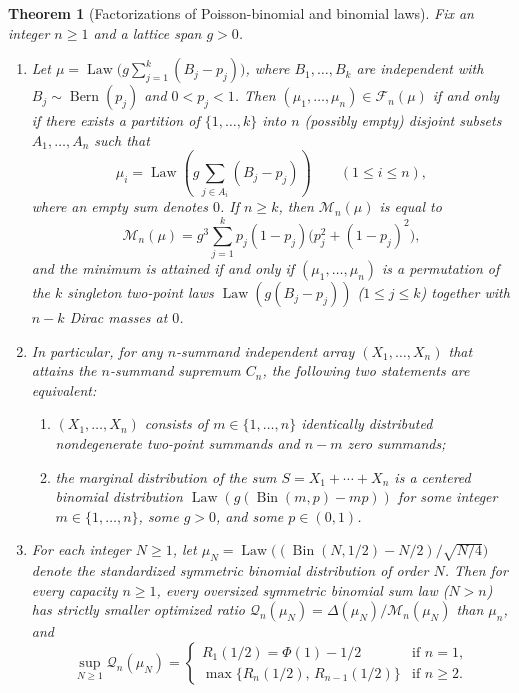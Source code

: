 \documentclass[11pt]{article}
\numberwithin{equation}{section}
\newtheorem{theorem}{Theorem}[section]
\theoremstyle{definition}
\theoremstyle{remark}
\DeclareMathOperator{\Bern}{Bern}
\DeclareMathOperator{\Bin}{Bin}
\DeclareMathOperator{\Law}{Law}
\begin{document}
\begin{theorem}[Factorizations of Poisson-binomial and binomial laws]\label{thm:binomial-fiber}
Fix an integer $n\ge1$ and a lattice span $g>0$.
\begin{enumerate}[label=(\roman*),leftmargin=2em]
\item\label{it:pb-fiber} Let $\mu=\Law\bigl(g\sum_{j=1}^k(B_j-p_j)\bigr)$,
where $B_1,\ldots,B_k$ are independent with $B_j\sim\Bern(p_j)$ and
$0<p_j<1$. Then $(\mu_1,\ldots,\mu_n)\in\mathcal F_n(\mu)$ if and only if
there exists a partition of $\{1,\ldots,k\}$ into $n$ (possibly empty)
disjoint subsets $A_1,\ldots,A_n$ such that
\begin{equation}\label{eq:pb-factor-form}
 \mu_i=\Law\left(g\sum_{j\in A_i}(B_j-p_j)\right)\qquad(1\le i\le n),
\end{equation}
where an empty sum denotes $0$. If $n\ge k$, then $\mathcal M_n(\mu)$ is
equal to
\begin{equation}\label{eq:pb-min-price}
 \mathcal M_n(\mu)=g^3\sum_{j=1}^k p_j(1-p_j)\bigl(p_j^2+(1-p_j)^2\bigr),
\end{equation}
and the minimum is attained if and only if $(\mu_1,\ldots,\mu_n)$ is a
permutation of the $k$ singleton two-point laws $\Law(g(B_j-p_j))$ ($1\le j\le k$)
together with $n-k$ Dirac masses at $0$.

\item\label{it:binomial-equivalence} In particular, for any $n$-summand
independent array $(X_1,\ldots,X_n)$ that attains the $n$-summand supremum
$C_n$, the following two statements are equivalent:
\begin{enumerate}[label=(\alph*),leftmargin=2em]
\item $(X_1,\ldots,X_n)$ consists of $m\in\{1,\ldots,n\}$ identically
distributed nondegenerate two-point summands and $n-m$ zero summands;
\item the marginal distribution of the sum $S=X_1+\cdots+X_n$ is a centered
binomial distribution $\Law(g(\Bin(m,p)-mp))$ for some integer
$m\in\{1,\ldots,n\}$, some $g>0$, and some $p\in(0,1)$.
\end{enumerate}

\item\label{it:fair-binomial-oversized} For each integer $N\ge1$, let
$\mu_N=\Law\bigl((\Bin(N,1/2)-N/2)/\sqrt{N/4}\bigr)$ denote the standardized
symmetric binomial distribution of order $N$. Then for every capacity $n\ge1$,
every oversized symmetric binomial sum law ($N>n$) has strictly smaller
optimized ratio $\mathcal Q_n(\mu_N)=\Delta(\mu_N)/\mathcal M_n(\mu_N)$ than
$\mu_n$, and
\begin{equation}\label{eq:fair-binomial-sup}
 \sup_{N\ge1}\mathcal Q_n(\mu_N)
 =\begin{cases}
 R_1(1/2)=\Phi(1)-1/2 & \text{if }n=1,\\[3pt]
 \max\bigl\{R_n(1/2),\,R_{n-1}(1/2)\bigr\} & \text{if }n\ge2.
 \end{cases}
\end{equation}
\end{enumerate}
\end{theorem}
\end{document}
